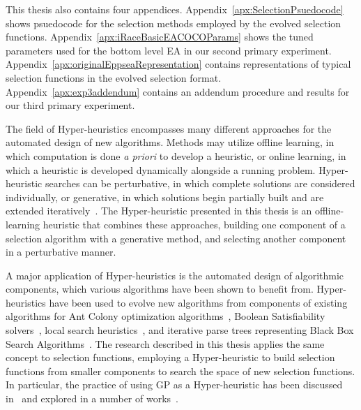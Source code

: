 \documentclass[times,12pt,titlepage]{mstogs}
\begin{document}
\begin{ThesisBody}
This thesis also contains four appendices. Appendix~\ref{apx:SelectionPsuedocode} shows psuedocode for the selection methods employed by the evolved selection functions. Appendix~\ref{apx:iRaceBasicEACOCOParams} shows the tuned parameters used for the bottom level EA in our second primary experiment. Appendix~\ref{apx:originalEppseaRepresentation} contains representations of typical selection functions in the evolved selection format. Appendix~\ref{apx:exp3addendum} contains an addendum procedure and results for our third primary experiment.

\label{Literature Review}
The field of Hyper-heuristics encompasses many different approaches for the automated design of new algorithms. Methods may utilize offline learning, in which computation is done \textit{a priori} to develop a heuristic, or online learning, in which a heuristic is developed dynamically alongside a running problem. Hyper-heuristic searches can be perturbative, in which complete solutions are considered individually, or generative, in which solutions begin partially built and are extended iteratively~\citep{burke2013HHstateoftheart}. The Hyper-heuristic presented in this thesis is an offline-learning heuristic that combines these approaches, building one component of a selection algorithm with a generative method, and selecting another component in a perturbative manner.

A major application of Hyper-heuristics is the automated design of algorithmic components, which various algorithms have been shown to benefit from. Hyper-heuristics have been used to evolve new algorithms from components of existing algorithms for Ant Colony optimization algorithms~\citep{lopez2012antcol}, Boolean Satisfiability solvers~\citep{khudabukhsh2009satenstein}, local search heuristics~\citep{burke2012localHeuristics}, and iterative parse trees representing Black Box Search Algorithms~\citep{martin2013evolvingBBSA}. The research described in this thesis applies the same concept to selection functions, employing a Hyper-heuristic to build selection functions from smaller components to search the space of new selection functions. In particular, the practice of using GP as a Hyper-heuristic has been discussed in~\citep{burke2009exploring} and explored in a number of works~\citep{burke2010strippacking, burke2006binpacking, harris2015comparison}. 


\end{ThesisBody}
\end{document}
